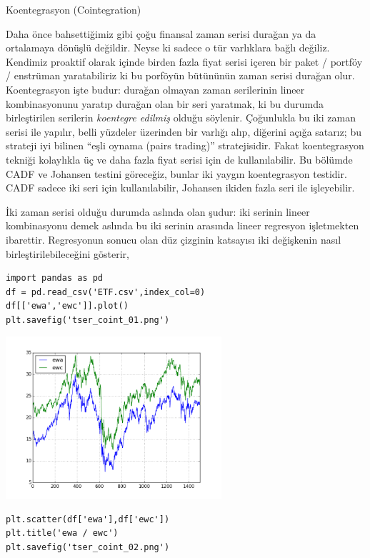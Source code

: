 \documentclass[12pt,fleqn]{article}\usepackage{../../common}
\begin{document}
Koentegrasyon (Cointegration)

Daha önce bahsettiğimiz gibi çoğu finansal zaman serisi durağan ya da
ortalamaya dönüşlü değildir. Neyse ki sadece o tür varlıklara bağlı
değiliz. Kendimiz proaktif olarak içinde birden fazla fiyat serisi içeren
bir paket / portföy / enstrüman yaratabiliriz ki bu porföyün bütününün
zaman serisi durağan olur. Koentegrasyon işte budur: durağan olmayan zaman
serilerinin lineer kombinasyonunu yaratıp durağan olan bir seri yaratmak,
ki bu durumda birleştirilen serilerin {\em koentegre edilmiş} olduğu
söylenir. Çoğunlukla bu iki zaman serisi ile yapılır, belli yüzdeler
üzerinden bir varlığı alıp, diğerini açığa satarız; bu strateji iyi bilinen
``eşli oynama (pairs trading)'' stratejisidir. Fakat koentegrasyon tekniği
kolaylıkla üç ve daha fazla fiyat serisi için de kullanılabilir. Bu bölümde
CADF ve Johansen testini göreceğiz, bunlar iki yaygın koentegrasyon
testidir. CADF sadece iki seri için kullanılabilir, Johansen ikiden fazla
seri ile işleyebilir.

İki zaman serisi olduğu durumda aslında olan şudur: iki serinin lineer
kombinasyonu demek aslında bu iki serinin arasında lineer regresyon
işletmekten ibarettir. Regresyonun sonucu olan düz çizginin katsayısı iki
değişkenin nasıl birleştirilebileceğini gösterir,

\begin{verbatim}
import pandas as pd
df = pd.read_csv('ETF.csv',index_col=0)
df[['ewa','ewc']].plot()
plt.savefig('tser_coint_01.png')
\end{verbatim}

\includegraphics[height=6cm]{tser_coint_01.png}

\begin{verbatim}
plt.scatter(df['ewa'],df['ewc'])
plt.title('ewa / ewc')
plt.savefig('tser_coint_02.png')
\end{verbatim}
\end{document}

